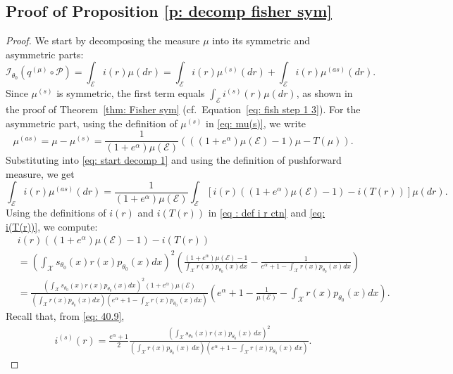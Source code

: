 \documentclass[a4paper, 11pt]{article}
\theoremstyle{definition}
\begin{document}
{\subsection{Proof of Proposition \ref{p: decomp fisher sym}}
\begin{proof}
We start by decomposing the measure \( \mu \) into its symmetric and asymmetric parts:
\begin{equation}\label{eq: start decomp 1}
\mathcal{I}_{\theta_0}(q^{(\mu)} \circ \mathcal{P}) = \int_{\mathcal{E}} i(r) \mu(dr) = \int_{\mathcal{E}} i(r) \mu^{(s)}(dr) + \int_{\mathcal{E}} i(r) \mu^{(as)}(dr).
\end{equation}
Since \( \mu^{(s)} \) is symmetric, the first term equals \( \int_{\mathcal{E}} i^{(s)}(r) \mu(dr) \), as shown in the proof of Theorem~\ref{thm: Fisher sym} (cf.~Equation~\eqref{eq: fish step 1 3}). For the asymmetric part, using the definition of \( \mu^{(s)} \) in \eqref{eq: mu(s)}, we write
\[
\mu^{(as)} = \mu - \mu^{(s)} = \frac{1}{(1 + e^\alpha) \mu(\mathcal{E})} \left( ((1 + e^\alpha) \mu(\mathcal{E}) - 1)\mu - T(\mu) \right).
\]
Substituting into \eqref{eq: start decomp 1} and using the definition of pushforward measure, we get
\begin{equation}\label{eq: asym decomp 2}
\int_{\mathcal{E}} i(r) \mu^{(as)}(dr) = \frac{1}{(1 + e^\alpha) \mu(\mathcal{E})} \int_{\mathcal{E}} \left[i(r)((1 + e^\alpha) \mu(\mathcal{E}) - 1) - i(T(r)) \right] \mu(dr).
\end{equation}
Using the definitions of \( i(r) \) and \( i(T(r)) \) in \eqref{eq : def i r ctn} and \eqref{eq: i(T(r))}, we compute:
\begin{align*}
& i(r)((1 + e^\alpha) \mu(\mathcal{E}) - 1) - i(T(r)) \\
&= \left( \int_\mathcal{X} s_{\theta_0}(x) r(x) p_{\theta_0}(x) dx \right)^2 \left( \frac{(1 + e^\alpha) \mu(\mathcal{E}) - 1}{\int_\mathcal{X} r(x) p_{\theta_0}(x) dx} - \frac{1}{e^\alpha + 1 - \int_\mathcal{X} r(x) p_{\theta_0}(x) dx} \right) \\
&= \frac{\left( \int_\mathcal{X} s_{\theta_0}(x) r(x) p_{\theta_0}(x) dx \right)^2 (1 + e^\alpha)\mu(\mathcal{E})}{\left( \int_\mathcal{X} r(x) p_{\theta_0}(x) dx \right)(e^\alpha + 1 - \int_\mathcal{X} r(x) p_{\theta_0}(x) dx)} \left( e^\alpha + 1 - \frac{1}{\mu(\mathcal{E})} - \int_\mathcal{X} r(x) p_{\theta_0}(x) dx \right).
\end{align*}
Recall that, from \eqref{eq: 40.9},
\begin{align*}
i^{(s)}(r) = \frac{e^\alpha + 1}{2} \frac{\left( \int_\mathcal{X} s_{\theta_0}(x) r(x) p_{\theta_0}(x) \, dx \right)^2}{\left( \int_\mathcal{X} r(x) p_{\theta_0}(x) \, dx \right) \left( e^\alpha + 1 - \int_\mathcal{X} r(x) p_{\theta_0}(x) \, dx \right)}.

\end{align*}
\end{proof}}
\end{document}
